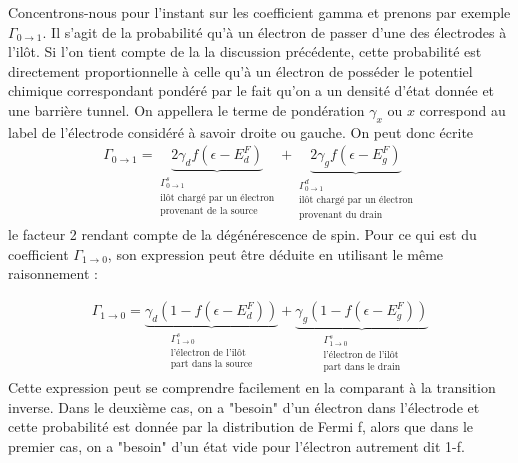 Concentrons-nous pour l'instant sur les coefficient gamma et prenons par exemple $\Gamma_{0 \rightarrow 1}$. Il s'agit de la probabilité qu'à un électron de passer d'une des électrodes à l'il\^ot. Si l'on tient compte de la la discussion précédente, cette probabilité est directement proportionnelle à celle qu'à un électron de posséder le potentiel chimique correspondant pondéré par le fait qu'on a un densité d'état donnée et une barrière tunnel. On appellera le terme de pondération $\gamma_x$ ou $x$ correspond au label de l'électrode considéré à savoir droite ou gauche. On peut donc écrite 
\begin{eqnarray}
\Gamma_{0 \rightarrow 1} = 
\underbrace{2\gamma_d f(\epsilon - E_d^F)}_{\substack{{\Gamma_{0 \rightarrow 1}^s}\\\text{il\^ot chargé par un électron}\\\text{provenant de la source}}}
+ 
\underbrace{2\gamma_g f(\epsilon - E_g^F)}_{\substack{{\Gamma_{0 \rightarrow 1}^d}\\\text{il\^ot chargé par un électron}\\\text{provenant du drain}}}
\end{eqnarray}
le facteur 2 rendant compte de la dégénérescence de spin. Pour ce qui est du coefficient $\Gamma_{1 \rightarrow 0}$, son expression peut être déduite en utilisant le même raisonnement :

\begin{eqnarray}
\Gamma_{1 \rightarrow 0} = 
\underbrace{\gamma_d (1 - f(\epsilon - E_d^F))}_{\substack{{\Gamma_{1 \rightarrow 0}^s}\\\text{l'électron de l'il\^ot}\\\text{part dans la source}}}
+ 
\underbrace{\gamma_g (1 - f(\epsilon - E_g^F))}_{\substack{{\Gamma_{1 \rightarrow 0}^s}\\\text{l'électron de l'il\^ot}\\\text{part dans le drain}}}
\end{eqnarray}
Cette expression peut se comprendre facilement en la comparant à la transition inverse. Dans le deuxième cas, on a "besoin" d'un électron dans l'électrode et cette probabilité est donnée par la distribution de Fermi f, alors que dans le premier cas, on a "besoin" d'un état vide pour l'électron autrement dit 1-f.

